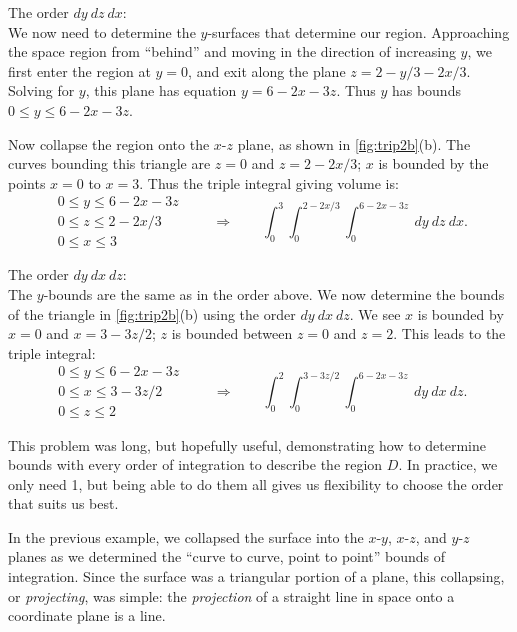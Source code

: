 {\noindent The order $dy\ dz\ dx$:\\

We now need to determine the $y$-surfaces that determine our region. Approaching the space region from ``behind'' and moving in the direction of increasing $y$, we first enter the region at $y=0$, and exit along the plane $z= 2-y/3-2x/3$. Solving for $y$, this plane has equation $y = 6-2x-3z$. Thus $y$ has bounds $0\leq y\leq 6-2x-3z$. 

Now collapse the region onto the $x$-$z$ plane, as shown in \autoref{fig:trip2b}(b). The curves bounding this triangle are $z=0$ and $z=2-2x/3$; $x$ is bounded by the points $x=0$ to $x=3$. Thus the triple integral giving volume is: 
\[
 \begin{gathered}
  0\leq y\leq 6-2x-3z\\
  0\leq z\leq 2-2x/3\\
  0\leq x\leq 3
 \end{gathered}
 \qquad\Rightarrow\qquad
 \int_0^3\int_0^{2-2x/3}\int_0^{6-2x-3z}\ dy\ dz\ dx.
\]

\noindent The order $dy\ dx\ dz$:\\

The $y$-bounds are the same as in the order above. We now determine the bounds of the triangle in \autoref{fig:trip2b}(b) using the order $dy\ dx\ dz$. We see $x$ is bounded by $x=0$ and $x=3-3z/2$; $z$ is bounded between $z=0$ and $z=2$. This leads to the triple integral:
\[
 \begin{gathered}
  0\leq y\leq 6-2x-3z\\
  0\leq x\leq 3-3z/2\\
  0\leq z\leq 2
 \end{gathered}
 \qquad\Rightarrow\qquad
 \int_0^2\int_0^{3-3z/2}\int_0^{6-2x-3z}\ dy\ dx\ dz.
\]

This problem was long, but hopefully useful, demonstrating how to determine bounds with every order of integration to describe the region $D$. In practice, we only need 1, but being able to do them all gives us flexibility to choose the order that suits us best.}

In the previous example, we collapsed the surface into the $x$-$y$, $x$-$z$, and $y$-$z$ planes as we determined the ``curve to curve, point to point'' bounds of integration. Since the surface was a triangular portion of a plane, this collapsing, or \textit{projecting}, was simple: the \textit{projection} of a straight line in space onto a coordinate plane is a line.


